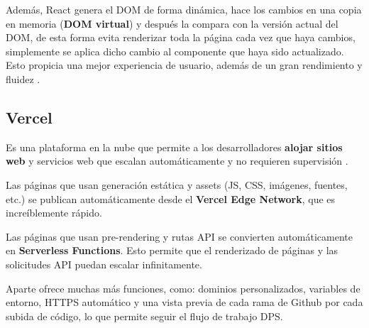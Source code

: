 \documentclass[12pt,twoside,titlepage]{report}
\begin{document}
Además, React genera el DOM de forma dinámica, hace los cambios en una copia en memoria (\textbf{DOM virtual}) y después la compara con la versión actual del DOM, de esta forma evita renderizar toda la página cada vez que haya cambios, simplemente se aplica dicho cambio al componente que haya sido actualizado. Esto propicia una mejor experiencia de usuario, además de un gran rendimiento y fluidez \cite{react2}.

\subsection{Vercel}
\label{sec:Vercel}

Es una plataforma en la nube que permite a los desarrolladores \textbf{alojar sitios web} y servicios web que escalan automáticamente y no requieren supervisión \cite{vercel1}. %

\begin{compactitem}
    \item Las páginas que usan generación estática y assets (JS, CSS, imágenes, fuentes, etc.) se publican automáticamente desde el \textbf{Vercel Edge Network}, que es increíblemente rápido.
    \item Las páginas que usan pre-rendering y rutas API se convierten automáticamente en \textbf{Serverless Functions}. Esto permite que el renderizado de páginas y las solicitudes API puedan escalar infinitamente.
\end{compactitem}

Aparte ofrece muchas más funciones, como: dominios personalizados, variables de entorno, HTTPS automático y una vista previa de cada rama de Github por cada subida de código, lo que permite seguir el flujo de trabajo DPS.
\end{document}
